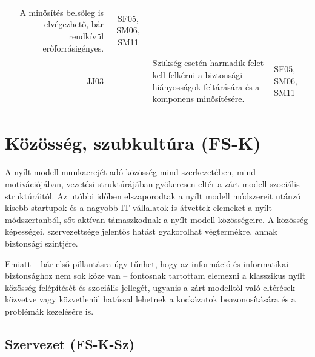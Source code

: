 \documentclass[12pt,magyar,a4paper,oneside]{scrreprt}
\begin{document}
\begin{longtable}[]{@{}rcll@{}}
\begin{minipage}[t]{0.69\columnwidth}
A minősítés belsőleg is elvégezhető, bár rendkívül
erőforrásigényes.\strut
\end{minipage} & \begin{minipage}[t]{0.13\columnwidth}\raggedright
SF05, SM06, SM11\strut
\end{minipage}\tabularnewline
\begin{minipage}[t]{0.03\columnwidth}\raggedleft
JJ03\strut
\end{minipage} & \begin{minipage}[t]{0.03\columnwidth}\centering
1\strut
\end{minipage} & \begin{minipage}[t]{0.69\columnwidth}\raggedright
Szükség esetén harmadik felet kell felkérni a biztonsági hiányosságok
feltárására és a komponens minősítésére.\strut
\end{minipage} & \begin{minipage}[t]{0.13\columnwidth}\raggedright
SF05, SM06, SM11\strut
\end{minipage}\tabularnewline
\bottomrule
\end{longtable}

\hypertarget{kuxf6zuxf6ssuxe9g-szubkultuxfara-fs-k}{%
\section{Közösség, szubkultúra
(FS-K)}\label{kuxf6zuxf6ssuxe9g-szubkultuxfara-fs-k}}

A nyílt modell munkaerejét adó közösség mind szerkezetében, mind
motivációjában, vezetési struktúrájában gyökeresen eltér a zárt modell
szociális struktúráitól. Az utóbbi időben elszaporodtak a nyílt modell
módszereit utánzó kisebb startupok és a nagyobb IT vállalatok is
átvettek elemeket a nyílt módszertanból, sőt aktívan támaszkodnak a
nyílt modell közösségeire. A közösség képességei, szervezettsége
jelentős hatást gyakorolhat végtermékre, annak biztonsági szintjére.

Emiatt -- bár első pillantásra úgy tűnhet, hogy az információ és
informatikai biztonsághoz nem sok köze van -- fontosnak tartottam
elemezni a klasszikus nyílt közösség felépítését és szociális jellegét,
ugyanis a zárt modelltől való eltérések közvetve vagy közvetlenül
hatással lehetnek a kockázatok beazonosítására és a problémák kezelésére
is.

\hypertarget{sec:FS-K-Sz}{%
\subsection{Szervezet (FS-K-Sz)}\label{sec:FS-K-Sz}}
\end{document}
